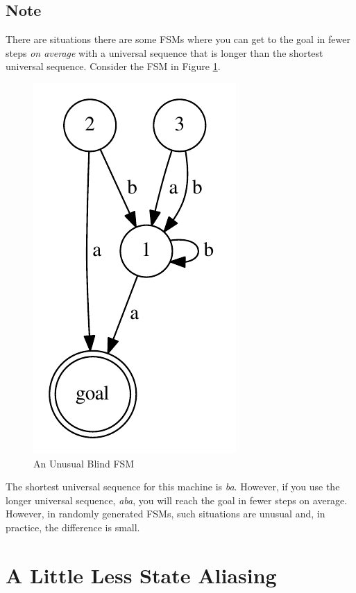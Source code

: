 \documentclass[letterpaper]{article} %
\begin{document}
\subsection{Note}

There are situations there are some FSMs where you can get to the goal
in fewer steps \textit{on average} with a universal sequence that is
longer than the shortest universal sequence.  Consider the FSM in
Figure \ref{fig2}.

\begin{figure}[t]
\centering
\includegraphics[width=0.5\columnwidth]{NoteFSM} %
\caption{An Unusual Blind FSM}
\label{fig2}
\end{figure}



The shortest universal sequence for this machine is \textit{ba}.
However, if you use the longer universal sequence, \textit{aba}, you
will reach the goal in fewer steps on average.  However, in randomly
generated FSMs, such situations are unusual and, in practice, the
difference is small.

\section{A Little Less State Aliasing}
\end{document}
